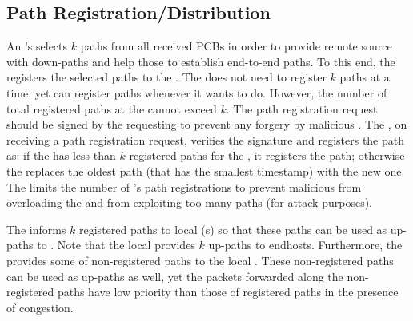 


\subsection{Path Registration/Distribution}
An \AD's \BS selects $k$ paths from all received PCBs in order to provide remote source \ADs with down-paths and help those \ADs to establish end-to-end paths. To this end, the \BS registers the selected paths to the \ISDC \PS. The \BS does not need to register $k$ paths at a time, yet can register paths whenever it wants to do. However, the number of total registered paths at the \ISDC \PS cannot exceed $k$. The path registration request should be signed by the requesting \AD to prevent any forgery by malicious \ADs. The \ISDC \PS, on receiving a path registration request, verifies the signature and registers the path as: if the \PS has less than $k$ registered paths for the \AD, it registers the path; otherwise the \PS replaces the oldest path (that has the smallest timestamp) with the new one. The \PS limits the number of \AD's path registrations to prevent malicious \ADs from overloading the \ISDC \PS and from exploiting too many paths (for attack purposes).

The \BS informs $k$ registered paths to local \PS(s) so that these paths can be used as up-paths to \ISDC. Note that the local \PS provides $k$ up-paths to endhosts. Furthermore, the \BS provides some of non-registered paths to the local \PS. These non-registered paths can be used as up-paths as well, yet the packets forwarded along the non-registered paths have low priority than those of registered paths in the presence of congestion. 


